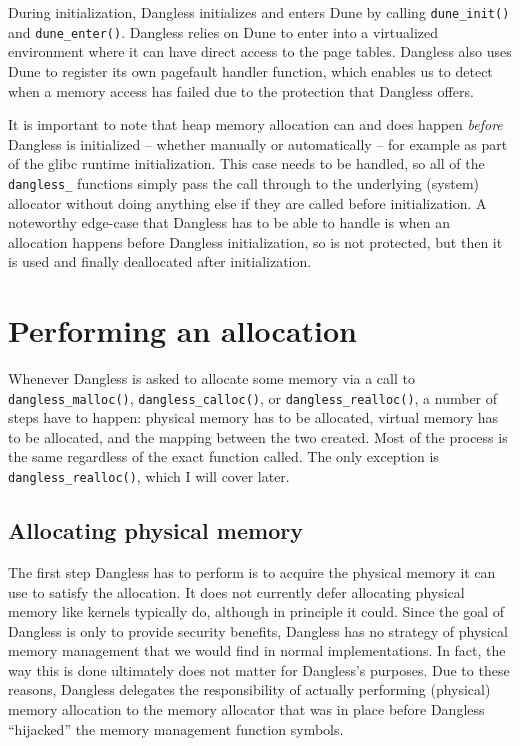 During initialization, Dangless initializes and enters Dune by calling \lstinline!dune_init()! and \lstinline!dune_enter()!. Dangless relies on Dune to enter into a virtualized environment where it can have direct access to the page tables. Dangless also uses Dune to register its own pagefault handler function, which enables us to detect when a memory access has failed due to the protection that Dangless offers.

It is important to note that heap memory allocation can and does happen \emph{before} Dangless is initialized -- whether manually or automatically -- for example as part of the glibc runtime initialization. This case needs to be handled, so all of the \lstinline!dangless_! functions simply pass the call through to the underlying (system) allocator without doing anything else if they are called before initialization. A noteworthy edge-case that Dangless has to be able to handle is when an allocation happens before Dangless initialization, so is not protected, but then it is used and finally deallocated after initialization.

\section{Performing an allocation}

Whenever Dangless is asked to allocate some memory via a call to \lstinline!dangless_malloc()!, \lstinline!dangless_calloc()!, or \lstinline!dangless_realloc()!, a number of steps have to happen: physical memory has to be allocated, virtual memory has to be allocated, and the mapping between the two created. Most of the process is the same regardless of the exact function called. The only exception is \lstinline!dangless_realloc()!, which I will cover later.

\subsection{Allocating physical memory}

The first step Dangless has to perform is to acquire the physical memory it can use to satisfy the allocation. It does not currently defer allocating physical memory like kernels typically do, although in principle it could.
Since the goal of Dangless is only to provide security benefits, Dangless has no strategy of physical memory management that we would find in normal implementations. In fact, the way this is done ultimately does not matter for Dangless's purposes. Due to these reasons, Dangless delegates the responsibility of actually performing (physical) memory allocation to the memory allocator that was in place before Dangless ``hijacked'' the memory management function symbols.

